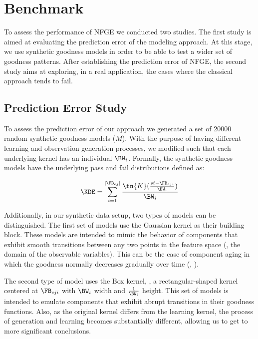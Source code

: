 \section{Benchmark}
\label{sec:nfge:results}

To assess the performance of \ac{NFGE} we conducted two studies.
%
The first study is aimed at evaluating the prediction error of the
modeling approach.
%
At this stage, we use synthetic goodness models in order to be able to
test a wider set of goodness patterns.
%
After establishing the prediction error of \ac{NFGE}, the second study
aims at exploring, in a real application, the cases where the
classical approach tends to fail.

\subsection{Prediction Error Study}
\label{sec:nfge:benchmark:prediction-error}
To assess the prediction error of our approach we generated a set of
$20000$ random synthetic goodness models ($M$).
%
With the purpose of having different learning and observation
generation processes, we modified  such that each
underlying kernel has an individual $\BW_i$.
%
Formally, the synthetic goodness models have the underlying pass and
fail distributions defined as:

\begin{equation}
  \KDE = {\sum_{i=1}^{|\FB_{ej}|} \frac {\fn{K}(\frac{st - \FB_{eji}}{\BW_i})}{\BW_i}}
  \label{eq:nfge:synthetic_kde}
\end{equation}

Additionally, in our synthetic data setup, two types of models can be
distinguished.
%
The first set of models use the Gaussian kernel as their building
block.
%
These models are intended to mimic the behavior of components that
exhibit smooth transitions between any two points in the feature space
(\ie, the domain of the observable variables).
%
This can be the case of component aging in which the goodness normally
decreases gradually over time (\eg,
).

The second type of model uses the Box kernel, \ie, a
rectangular-shaped kernel centered at $\FB_{eji}$ with $\BW_i$ width
and $\frac{1}{\BW_i}$ height.
%
This set of models is intended to emulate components that exhibit
abrupt transitions in their goodness functions.
%
Also, as the original kernel differs from the learning kernel, the
process of generation and learning becomes substantially different,
allowing us to get to more significant conclusions.

